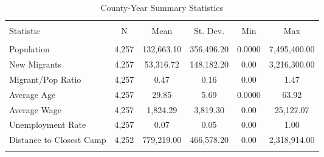 
\begin{table}[!htbp] \centering 
  \caption{County-Year Summary Statistics} 
  \label{ctysumstats} 
\begin{tabular}{@{\extracolsep{5pt}}lccccc} 
\\[-1.8ex]\hline 
\hline \\[-1.8ex] 
Statistic & \multicolumn{1}{c}{N} & \multicolumn{1}{c}{Mean} & \multicolumn{1}{c}{St. Dev.} & \multicolumn{1}{c}{Min} & \multicolumn{1}{c}{Max} \\ 
\hline \\[-1.8ex] 
Population & 4,257 & 132,663.10 & 356,496.20 & 0.0000 & 7,495,400.00 \\ 
New Migrants & 4,257 & 53,316.72 & 148,182.20 & 0.00 & 3,216,300.00 \\ 
Migrant/Pop Ratio & 4,257 & 0.47 & 0.16 & 0.00 & 1.47 \\ 
Average Age & 4,257 & 29.85 & 5.69 & 0.0000 & 63.92 \\ 
Average Wage & 4,257 & 1,824.29 & 3,819.30 & 0.00 & 25,127.07 \\ 
Unemployment Rate & 4,257 & 0.07 & 0.05 & 0.00 & 1.00 \\ 
Distance to Closest Camp & 4,252 & 779,219.00 & 466,578.20 & 0.00 & 2,318,914.00 \\ 
\hline \\[-1.8ex] 
\end{tabular} 
\end{table} 
